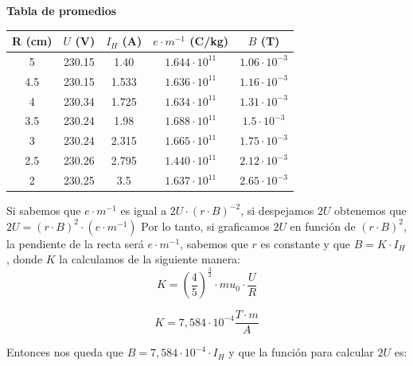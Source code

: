\documentclass[a4paper]{article}
\begin{document}
    \begin{center}
        \begin{minipage}[c]{7.5cm}
            \centering
            \textbf{Tabla de promedios}
            \vspace {2mm}
        \end{minipage}

        \begin{tabular}{ c c c c c }
            \toprule
            R (cm) & $U$ (V) & $I_H$ (A) & $e \cdot m^{-1}$ (C/kg) & $B$ (T)\\
            \midrule
            5 & 230.15 & 1.40 & $1.644 \cdot 10^{11}$ & $1.06 \cdot 10^{-3}$ \\
            4.5 & 230.15 & 1.533 & $1.636 \cdot 10^{11}$ & $1.16 \cdot 10^{-3}$ \\
            4 & 230.34 & 1.725 & $1.634 \cdot 10^{11}$ & $1.31 \cdot 10^{-3}$ \\
            3.5 & 230.24 & 1.98 & $1.688 \cdot 10^{11}$ & $1.5 \cdot 10^{-3}$ \\
            3 & 230.24 & 2.315 & $1.665 \cdot 10^{11}$ & $1.75 \cdot 10^{-3}$ \\
            2.5 & 230.26 & 2.795 & $1.440 \cdot 10^{11}$ & $2.12 \cdot 10^{-3}$ \\
            2 & 230.25 & 3.5 & $1.637 \cdot 10^{11}$ & $2.65 \cdot 10^{-3}$ \\
            \bottomrule
        \end{tabular}
    \end{center}

    \indent Si sabemos que $e \cdot m^{-1}$ es igual a $2U \cdot (r \cdot B)^{-2}$, si despejamos $2U$ obtenemos que $2U = (r \cdot B)^2 \cdot (e \cdot m^{-1}) $ Por lo tanto, si graficamos $2U$ en función de $(r \cdot B)^2$, la pendiente de la recta será $e \cdot m^{-1}$, sabemos que $r$ es constante y que $B = K \cdot I_H$, donde $K$ la calculamos de la siguiente manera:\\

    \begin{equation}
        K = (\frac{4}{5})^{\frac{3}{2}} \cdot mu_{0} \cdot \frac{U}{R}
    \end{equation}
    
    \begin{equation}
        K = 7,584 \cdot 10^{-4} \frac{T \cdot m}{A} 
    \end{equation}

    \indent Entonces nos queda que $B = 7,584 \cdot 10^{-4} \cdot I_H$ y que la función para calcular $2U$ es:
\end{document}
